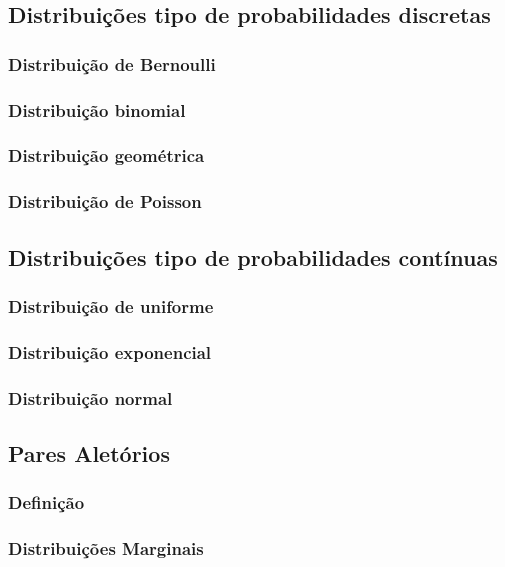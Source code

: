 \documentclass[a4paper,12pt]{article}
\begin{document}
		\subsection{Distribuições tipo de probabilidades discretas}
			\subsubsection{Distribuição de Bernoulli}
			\subsubsection{Distribuição binomial }
			\subsubsection{Distribuição geométrica }
			\subsubsection{Distribuição de Poisson}
		\subsection{Distribuições tipo de probabilidades contínuas}
			\subsubsection{Distribuição de uniforme}
                        \subsubsection{Distribuição exponencial}
                        \subsubsection{Distribuição normal}
		\cleanpage
		\subsection{Pares Aletórios}
			\subsubsection{Definição}
			\subsubsection{Distribuições Marginais}
\end{document}
